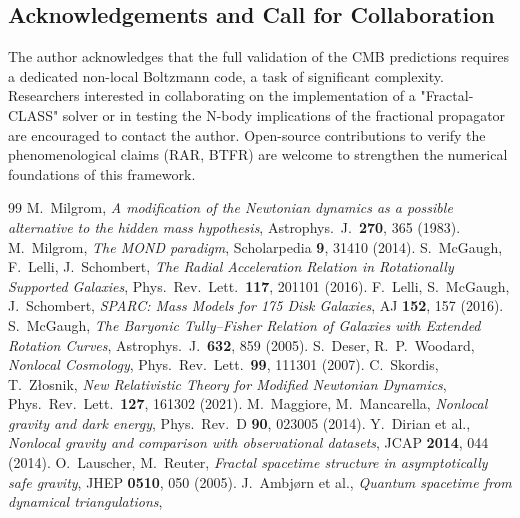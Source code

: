 \documentclass[11pt,a4paper]{article}
\begin{document}
\begin{onehalfspacing}
\section*{Acknowledgements and Call for Collaboration}
The author acknowledges that the full validation of the CMB predictions requires a dedicated non-local Boltzmann code, a task of significant complexity. 
Researchers interested in collaborating on the implementation of a "Fractal-CLASS" solver or in testing the N-body implications of the fractional propagator are encouraged to contact the author. 
Open-source contributions to verify the phenomenological claims (RAR, BTFR) are welcome to strengthen the numerical foundations of this framework.
\begin{thebibliography}{99}
M.~Milgrom,
\emph{A modification of the Newtonian dynamics as a possible alternative to the hidden mass hypothesis},
Astrophys.\ J.\ \textbf{270}, 365 (1983).
M.~Milgrom,
\emph{The MOND paradigm},
Scholarpedia \textbf{9}, 31410 (2014).
S.~McGaugh, F.~Lelli, J.~Schombert,
\emph{The Radial Acceleration Relation in Rotationally Supported Galaxies},
Phys.\ Rev.\ Lett.\ \textbf{117}, 201101 (2016).
F.~Lelli, S.~McGaugh, J.~Schombert,
\emph{SPARC: Mass Models for 175 Disk Galaxies},
AJ \textbf{152}, 157 (2016).
S.~McGaugh,
\emph{The Baryonic Tully–Fisher Relation of Galaxies with Extended Rotation Curves},
Astrophys.\ J.\ \textbf{632}, 859 (2005).
S.~Deser, R.~P.~Woodard,
\emph{Nonlocal Cosmology},
Phys.\ Rev.\ Lett.\ \textbf{99}, 111301 (2007).
C.~Skordis, T.~Z\l osnik,
\emph{New Relativistic Theory for Modified Newtonian Dynamics},
Phys.\ Rev.\ Lett.\ \textbf{127}, 161302 (2021).
M.~Maggiore, M.~Mancarella,
\emph{Nonlocal gravity and dark energy},
Phys.\ Rev.\ D \textbf{90}, 023005 (2014).
Y.~Dirian et al.,
\emph{Nonlocal gravity and comparison with observational datasets},
JCAP \textbf{2014}, 044 (2014).
O.~Lauscher, M.~Reuter,
\emph{Fractal spacetime structure in asymptotically safe gravity},
JHEP \textbf{0510}, 050 (2005).
J.~Ambj{\o}rn et al.,
\emph{Quantum spacetime from dynamical triangulations},

\end{thebibliography}
\end{onehalfspacing}
\end{document}
